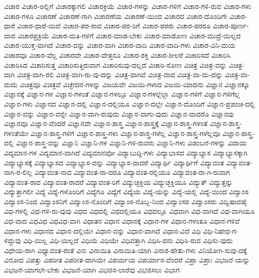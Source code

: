 {ವಿಚಾರ
ವಿಚಾರ-ಅಲ್ಲಿಗೆ
ವಿಚಾರಕ್ಕಾಗಲಿ
ವಿಚಾರಕ್ರಿಯೆ
ವಿಚಾರ-ಗಳನ್ನು
ವಿಚಾರ-ಗಳಿಗೆ
ವಿಚಾರ-ಗಳಿ-ರುವ
ವಿಚಾರ-ಗಳು
ವಿಚಾರ-ಗಳೂ
ವಿಚಾರಣೆ
ವಿಚಾರಣೆ-ಗಾಗಿ
ವಿಚಾರಣೆಯ
ವಿಚಾರಣೆ-ಯಿಂದ
ವಿಚಾರದ
ವಿಚಾರ-ದೊಂದಿಗೇ
ವಿಚಾರ-ಧಾರೆ
ವಿಚಾರ-ಧಾರೆ-ಯಿದೆ
ವಿಚಾರ-ಪರ-ರಾದ
ವಿಚಾರ-ಪರ-ರಿಗೆ
ವಿಚಾರ-ಪರರು
ವಿಚಾರ-ಪರರೂ
ವಿಚಾರ-ಪೂರ್ಣ-ವಾದ
ವಿಚಾರಪ್ರಕ್ರಿಯೆ
ವಿಚಾರ-ಮತಿ-ಗಳಿಗೆ
ವಿಚಾರ-ಮಾಡ-ಬೇಕು
ವಿಚಾರ-ಮಾಡೋಣ
ವಿಚಾರ-ಮುದ್ರೆ-ಯಿಲ್ಲದ
ವಿಚಾರ-ಯುಕ್ತ-ವಾಗಿದೆ
ವಿಚಾರ-ವನ್ನು
ವಿಚಾರ-ವಾಗಿ
ವಿಚಾರ-ವಾದಿ
ವಿಚಾರ-ವಾದಿ-ಗಳು
ವಿಚಾರ-ವಿನಿ-ಮಯ
ವಿಚಾರವೂ
ವಿಚಾರ-ವೆಲ್ಲ
ವಿಚಾರವೇ
ವಿಚಾರ-ವೇತ್ತನೂ
ವಿಚಾರ-ಶಕ್ತಿ
ವಿಚಾರ-ಶೀಲರೆ
ವಿಚಾರಿಸದೆ
ವಿಚಾರಿಸಿ
ವಿಚಾರಿಸಿದ
ವಿಚಾರಿಸುತ್ತ
ವಿಚಾರಿಸುತ್ತಿರುವಾಗ
ವಿಚಾರಿಸುವು-ದಲ್ಲದೆ
ವಿಚಾರಿ-ಸೋಣ
ವಿಚಿತ್ರ
ವಿಚಿತ್ರ-ವನ್ನು
ವಿಚಿತ್ರ-ವಾಗಿ
ವಿಚಿತ್ರ-ವಾಗಿ-ರಲಿ
ವಿಚಿತ್ರ-ವಾಗಿ-ರು-ವು-ದನ್ನು
ವಿಚಿತ್ರ-ವಾಗಿವೆ
ವಿಚಿತ್ರ-ವಾದ
ವಿಚಿತ್ರ-ವಾ-ದು-ದನ್ನು
ವಿಚಿತ್ರ-ವಾ-ದುದು
ವಿಚಿತ್ರವೂ
ವಿಚಿತ್ರವೆ
ವಿಚ್ಛೇದನ-ಗಳನ್ನು
ವಿಜಯವೇ
ವಿಜಯಿ-ಗಳಾದ
ವಿಜಯಿ-ಯಾದನು
ವಿಜ್ಞಾನ
ವಿಜ್ಞಾನಕ್ಕೂ
ವಿಜ್ಞಾನಕ್ಕೆ
ವಿಜ್ಞಾನ-ಗಳ
ವಿಜ್ಞಾನ-ಗಳಂತೆ
ವಿಜ್ಞಾನ-ಗಳಲ್ಲೂ
ವಿಜ್ಞಾನ-ಗಳಲ್ಲೆಲ್ಲಾ
ವಿಜ್ಞಾನ-ಗಳಿಗೆ
ವಿಜ್ಞಾನ-ಗಳಿಗೆಲ್ಲ
ವಿಜ್ಞಾನ-ಗಳು
ವಿಜ್ಞಾನದ
ವಿಜ್ಞಾನ-ದಲ್ಲಿ
ವಿಜ್ಞಾನ-ದಲ್ಲಿಯೂ
ವಿಜ್ಞಾನ-ದಲ್ಲೇ
ವಿಜ್ಞಾನ-ದೊಂದಿಗೆ
ವಿಜ್ಞಾನ-ಪ್ರಪಂಚ-ದಲ್ಲಿ
ವಿಜ್ಞಾನ-ವನ್ನು
ವಿಜ್ಞಾನ-ವನ್ನೇ
ವಿಜ್ಞಾನ-ವಾಗಿ-ರುವುದು
ವಿಜ್ಞಾನ-ವಾಗು-ವುದು
ವಿಜ್ಞಾನ-ವಾದರೊ
ವಿಜ್ಞಾನವು
ವಿಜ್ಞಾನವೂ
ವಿಜ್ಞಾನ-ವೆಂದರೆ
ವಿಜ್ಞಾನವೇ
ವಿಜ್ಞಾನ-ಶಾಸ್ತ್ರ
ವಿಜ್ಞಾನ-ಶಾಸ್ತ್ರಕ್ಕೆ
ವಿಜ್ಞಾನ-ಶಾಸ್ತ್ರ-ಗಳಂತೆ
ವಿಜ್ಞಾನ-ಶಾಸ್ತ್ರ-ಗಳಂತೆಯೇ
ವಿಜ್ಞಾನ-ಶಾಸ್ತ್ರ-ಗಳಿಗೆ
ವಿಜ್ಞಾನ-ಶಾಸ್ತ್ರ-ಗಳು
ವಿಜ್ಞಾನ-ಶಾಸ್ತ್ರ-ಗಳೆಲ್ಲ
ವಿಜ್ಞಾನ-ಶಾಸ್ತ್ರ-ಗಳೆಲ್ಲವೂ
ವಿಜ್ಞಾನ-ಶಾಸ್ತ್ರ-ದಲ್ಲಿ
ವಿಜ್ಞಾನ-ಶಾಸ್ತ್ರ-ವನ್ನು
ವಿಜ್ಞಾನಿ
ವಿಜ್ಞಾನಿ-ಗಳ
ವಿಜ್ಞಾನಿ-ಗಳಿ-ರುವರು
ವಿಜ್ಞಾನಿ-ಗಳು
ವಿಡಂಬನೆ-ಗಳನ್ನು
ವಿದಾಯ
ವಿದ್ಯಮಾನ-ಗಳ
ವಿದ್ಯಮಾನ-ವಾಗಿದೆ
ವಿದ್ಯಮಾನವೋ
ವಿದ್ಯಾಬುದ್ದಿ-ಗಳು
ವಿದ್ಯಾಭಾಸದ
ವಿದ್ಯಾಭ್ಯಾಸ
ವಿದ್ಯಾಭ್ಯಾಸಕ್ಕಾಗಿ
ವಿದ್ಯಾಭ್ಯಾಸಕ್ಕೆ
ವಿದ್ಯಾಭ್ಯಾಸದ
ವಿದ್ಯಾಭ್ಯಾಸ-ವನ್ನು
ವಿದ್ಯಾಭ್ಯಾಸ-ವಾದರೆ
ವಿದ್ಯಾರ್ಥಿ
ವಿದ್ಯಾರ್ಥಿಗೆ
ವಿದ್ಯಾವಂತ
ವಿದ್ಯಾವಂತ-ನಾಗಿ-ರ-ಲಿಲ್ಲ
ವಿದ್ಯಾವಂತ-ನಾದ
ವಿದ್ಯಾವಂತ-ನಾ-ದರೂ
ವಿದ್ಯಾವಂತ-ರಲ್ಲಿಯೂ
ವಿದ್ಯಾವಂತ-ರಾ-ಗಿ-ರುವಾಗ
ವಿದ್ಯಾವಂತ-ರಾದ
ವಿದ್ಯಾವಂತ-ರಾದರೆ
ವಿದ್ಯಾವಂತ-ರಿಗೆ
ವಿದ್ಯುಚ್ಛಕ್ತಿಯ
ವಿದ್ಯುಚ್ಛಕ್ತಿಯೂ
ವಿದ್ಯುತ್
ವಿದ್ಯುತ್ತನ್ನು
ವಿದ್ಯುತ್ತಾಗಲೀ
ವಿದ್ಯೆ
ವಿದ್ಯೆ-ಗಳೊಂದಿಗೆ
ವಿದ್ಯೆಗೂ
ವಿದ್ಯೆಗೆ
ವಿದ್ಯೆಯ
ವಿದ್ಯೆ-ಯನ್ನು
ವಿದ್ಯೆ-ಯಲ್ಲಿ
ವಿದ್ಯೆ-ಯಿಂದ
ವಿದ್ವಾಂಸ
ವಿದ್ವಾಂಸ-ನಿಂದ
ವಿದ್ವಾಂಸನಿಗೆ
ವಿದ್ವಾಂಸ-ನೊಂದಿಗೆ
ವಿದ್ವಾಂಸ-ನೊಬ್ಬ-ನಿಂದ
ವಿದ್ವಾಂಸರ
ವಿದ್ವಾಂಸರು
ವಿದ್ವಿಷಾವಹೈ
ವಿಧ-ಗಳಲ್ಲಿ
ವಿಧ-ಗಳಿ-ರು-ವುವು
ವಿಧದ
ವಿಧದಲ್ಲಿ
ವಿಧದಲ್ಲಿಯೂ
ವಿಧದಲ್ಲೂ
ವಿಧವಾಗಿ
ವಿಧ-ವಾಗಿದೆ
ವಿಧ-ವಾಗಿಯೂ
ವಿಧ-ವಾದ
ವಿಧವಿಧ
ವಿಧವಿಧ-ವಾಗಿ
ವಿಧಾತನ
ವಿಧಾನ
ವಿಧಾನಕ್ಕೆ
ವಿಧಾನ-ಗಳ
ವಿಧಾನ-ಗಳಂತೂ
ವಿಧಾನ-ಗಳಿವೆ
ವಿಧಾನ-ಗಳು
ವಿಧಾನದ
ವಿಧಾನ-ದಲ್ಲಿಯೇ
ವಿಧಾನ-ವನ್ನು
ವಿಧಾನ-ವಾಗಿದೆ
ವಿಧಾನ-ವಿದೆ
ವಿಧಿ
ವಿಧಿ-ನಿಷೇಧ-ಗ-ಳಿದ್ದುವು
ವಿಧಿ-ಯಿಲ್ಲ
ವಿಧಿ-ಯಿಲ್ಲದೆ
ವಿಧಿಯೆ
ವಿಧಿಯೇ
ವಿಧಿವತ್ತಾಗಿ
ವಿಧಿಸಿ-ದನು
ವಿಧಿಸಿ-ರುವ
ವಿಧಿಸು-ವುದು
ವಿಧೇಯ-ರಾಗಿ
ವಿಧ್ಯಾವಂತ-ರಂತೆ
ವಿನಃ
ವಿನಾಯಿತಿ
ವಿನಾಯಿತಿ-ಯಾಗಿ
ವಿನಾಶ-ಹೇತು-ಗಳು
ವಿನಿಯೋಗಿ-ಸುವು-ದಕ್ಕೆ
ವಿನೋದ
ವಿಪತ್ತು
ವಿಪರೀತ
ವಿಪರೀತ-ವಾಗಿಯೇ
ವಿಪರ್ಯಯ
ವಿಪರ್ಯಾಸ-ವೆಂದರೆ
ವಿಪ್ರಾ
ವಿಪ್ರಾಃ
ವಿಭಜನೆ-ಯನ್ನು
ವಿಭಜನೆ-ಯಾಗಲೇ-ಬೇಕು
ವಿಭಜನೆ-ಯಾಗಿ
ವಿಭಜಿಸ-ಲಾರೆವು
ವಿಭಜಿಸಲು
ವಿಭಾಗ
}

